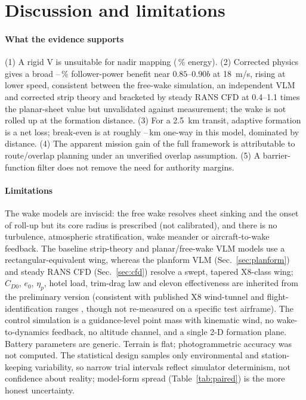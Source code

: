 \documentclass[preprint,12pt]{elsarticle}
\begin{document}


\section{Discussion and limitations}
\paragraph{What the evidence supports} (1) A rigid V is unsuitable for nadir mapping (\nrelCSheet\,\% energy). (2) Corrected physics gives a broad \npeakFree--\npeakSheet\,\% follower-power benefit near $0.85$--$0.90b$ at \SI{18}{m/s}, rising at lower speed, consistent between the free-wake simulation, an independent VLM and corrected strip theory and bracketed by steady RANS CFD at 0.4--1.1 times the planar-sheet value but unvalidated against measurement; the wake is not rolled up at the formation distance. (3) For a \SI{2.5}{km} transit, adaptive formation is a net loss; break-even is at roughly \nbeSevSheet--\nbeSevFree\,km one-way in this model, dominated by distance. (4) The apparent mission gain of the full framework is attributable to route/overlap planning under an unverified overlap assumption. (5) A barrier-function filter does not remove the need for authority margins.

\paragraph{Limitations} The wake models are inviscid: the free wake resolves sheet sinking and the onset of roll-up but its core radius is prescribed (not calibrated), and there is no turbulence, atmospheric stratification, wake meander or aircraft-to-wake feedback. The baseline strip-theory and planar/free-wake VLM models use a rectangular-equivalent wing, whereas the planform VLM (Sec.~\ref{sec:planform}) and steady RANS CFD (Sec.~\ref{sec:cfd}) resolve a swept, tapered X8-class wing; $C_{D0}$, $e_0$, $\eta_p$, hotel load, trim-drag law and elevon effectiveness are inherited from the preliminary version (consistent with published X8 wind-tunnel and flight-identification ranges \cite{gryte2018,reinhardt2022}, though not re-measured on a specific test airframe). The control simulation is a guidance-level point mass with kinematic wind, no wake-to-dynamics feedback, no altitude channel, and a single 2-D formation plane. Battery parameters are generic. Terrain is flat; photogrammetric accuracy was not computed. The statistical design samples only environmental and station-keeping variability, so narrow trial intervals reflect simulator determinism, not confidence about reality; model-form spread (Table~\ref{tab:paired}) is the more honest uncertainty.
\end{document}
